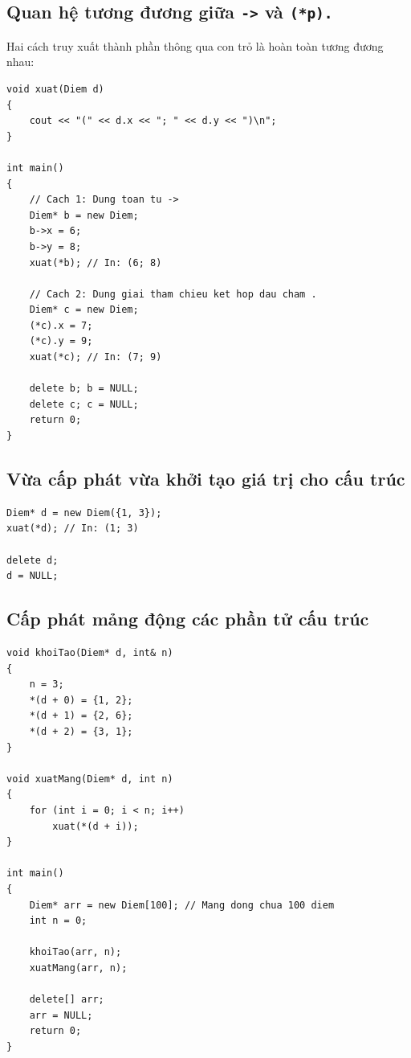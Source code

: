 \documentclass[12pt,a4paper]{article}
\begin{document}
\subsection{Quan hệ tương đương giữa \texttt{->} và \texttt{(*p).}}
Hai cách truy xuất thành phần thông qua con trỏ là hoàn toàn tương đương nhau:
\begin{center}
\end{center}
\begin{lstlisting}
void xuat(Diem d)
{
    cout << "(" << d.x << "; " << d.y << ")\n";
}

int main()
{
    // Cach 1: Dung toan tu ->
    Diem* b = new Diem;
    b->x = 6;
    b->y = 8;
    xuat(*b); // In: (6; 8)

    // Cach 2: Dung giai tham chieu ket hop dau cham .
    Diem* c = new Diem;
    (*c).x = 7;
    (*c).y = 9;
    xuat(*c); // In: (7; 9)

    delete b; b = NULL;
    delete c; c = NULL;
    return 0;
}
\end{lstlisting}

\subsection{Vừa cấp phát vừa khởi tạo giá trị cho cấu trúc}
\begin{lstlisting}
Diem* d = new Diem({1, 3});
xuat(*d); // In: (1; 3)

delete d;
d = NULL;
\end{lstlisting}

\subsection{Cấp phát mảng động các phần tử cấu trúc}
\begin{lstlisting}
void khoiTao(Diem* d, int& n)
{
    n = 3;
    *(d + 0) = {1, 2};
    *(d + 1) = {2, 6};
    *(d + 2) = {3, 1};
}

void xuatMang(Diem* d, int n)
{
    for (int i = 0; i < n; i++)
        xuat(*(d + i));
}

int main()
{
    Diem* arr = new Diem[100]; // Mang dong chua 100 diem
    int n = 0;

    khoiTao(arr, n);
    xuatMang(arr, n);

    delete[] arr;
    arr = NULL;
    return 0;
}
\end{lstlisting}
\end{document}
